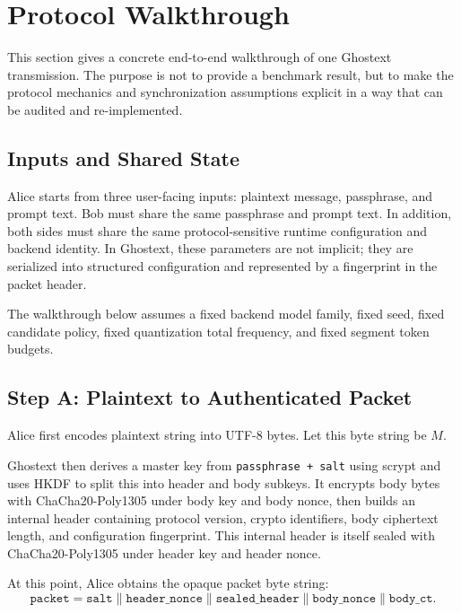 \section{Protocol Walkthrough}

This section gives a concrete end-to-end walkthrough of one Ghostext transmission. The purpose is not to provide a benchmark result, but to make the protocol mechanics and synchronization assumptions explicit in a way that can be audited and re-implemented.

\subsection{Inputs and Shared State}

Alice starts from three user-facing inputs: plaintext message, passphrase, and prompt text. Bob must share the same passphrase and prompt text. In addition, both sides must share the same protocol-sensitive runtime configuration and backend identity. In Ghostext, these parameters are not implicit; they are serialized into structured configuration and represented by a fingerprint in the packet header.

The walkthrough below assumes a fixed backend model family, fixed seed, fixed candidate policy, fixed quantization total frequency, and fixed segment token budgets.

\subsection{Step A: Plaintext to Authenticated Packet}

Alice first encodes plaintext string into UTF-8 bytes. Let this byte string be $M$.

Ghostext then derives a master key from \texttt{passphrase + salt} using scrypt and uses HKDF to split this into header and body subkeys. It encrypts body bytes with ChaCha20-Poly1305 under body key and body nonce, then builds an internal header containing protocol version, crypto identifiers, body ciphertext length, and configuration fingerprint. This internal header is itself sealed with ChaCha20-Poly1305 under header key and header nonce.

At this point, Alice obtains the opaque packet byte string:
\begin{equation}
\texttt{packet} = \texttt{salt} \parallel \texttt{header\_nonce} \parallel \texttt{sealed\_header} \parallel \texttt{body\_nonce} \parallel \texttt{body\_ct}.
\end{equation}

